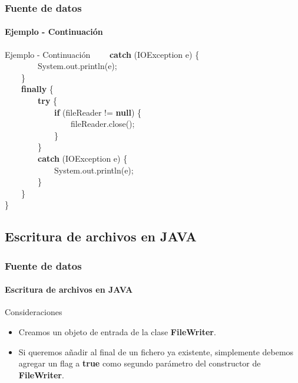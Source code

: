 \documentclass{beamer}
\begin{document}
		\begin{frame}
			\frametitle{Fuente de datos}
			\framesubtitle{Ejemplo - Continuaci\'on}

			\begin{block}{Ejemplo  - Continuaci\'on}
			{\scriptsize
				\ \ \ \ \textbf{catch} (IOException e) \{ \\
                                     \ \ \ \ \ \ \ \ System.out.println(e); \\
                                     \ \ \ \ \} \\
                                     \ \ \ \ \textbf{finally} \{ \\
                                     \ \ \ \ \ \ \ \ \textbf{try} \{ \\
                                     \ \ \ \ \ \ \ \ \ \ \ \ \textbf{if} (fileReader !=  \textbf{null}) \{ \\
                                     \ \ \ \ \ \ \ \ \ \ \ \ \ \ \ \ fileReader.close(); \\
                                     \ \ \ \ \ \ \ \ \ \ \ \ \} \\
                                     \ \ \ \ \ \ \ \ \} \\
                                     \ \ \ \ \ \ \ \ \textbf{catch} (IOException e) \{ \\
                                     \ \ \ \ \ \ \ \ \ \ \ \ System.out.println(e); \\
                                     \ \ \ \ \ \ \ \ \}\\
                                     \ \ \ \ \} \\
                                     \}
			}
			\end{block}
		\end{frame}

		\subsection{Escritura de archivos en JAVA}

		\begin{frame}
			\frametitle{Fuente de datos}
			\framesubtitle{Escritura de archivos en JAVA}

			\begin{block}{Consideraciones}
				\begin{itemize}
					\item Creamos un objeto de entrada de la clase \textbf{FileWriter}. 
					\item Si queremos a\~nadir al final de un fichero ya existente, simplemente debemos agregar un flag a \textbf{true} como segundo par\'ametro del constructor de \textbf{FileWriter}.
				\end{itemize}
			\end{block}
		\end{frame}
\end{document}
